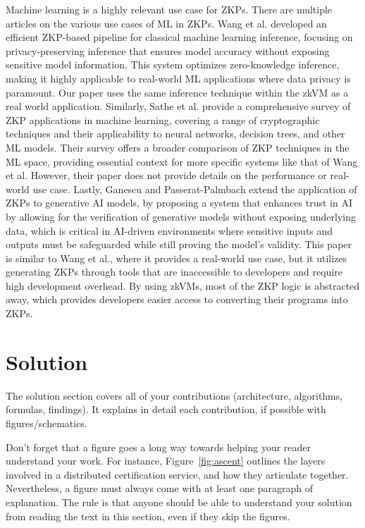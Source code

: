 \documentclass{scrartcl}
\begin{document}
Machine learning is a highly relevant use case for ZKPs. There are multiple articles on the various use cases of ML in ZKPs. Wang et al.\cite{wang2024efficient} developed an efficient ZKP-based pipeline for classical machine learning inference, focusing on privacy-preserving inference that ensures model accuracy without exposing sensitive model information. This system optimizes zero-knowledge inference, making it highly applicable to real-world ML applications where data privacy is paramount. Our paper uses the same inference technique within the zkVM as a real world application. Similarly, Sathe et al.\cite{sathe2024survey} provide a comprehensive survey of ZKP applications in machine learning, covering a range of cryptographic techniques and their applicability to neural networks, decision trees, and other ML models. Their survey offers a broader comparison of ZKP techniques in the ML space, providing essential context for more specific systems like that of Wang et al. However, their paper does not provide details on the performance or real-world use case. Lastly, Ganescu and Passerat-Palmbach\cite{ganescu2024trust} extend the application of ZKPs to generative AI models, by proposing a system that enhances trust in AI by allowing for the verification of generative models without exposing underlying data, which is critical in AI-driven environments where sensitive inputs and outputs must be safeguarded while still proving the model’s validity. This paper is similar to Wang et al., where it provides a real-world use case, but it utilizes generating ZKPs through tools that are inaccessible to developers and require high development overhead. By using zkVMs, most of the ZKP logic is abstracted away, which provides developers easier access to converting their programs into ZKPs.

\section{Solution}

The solution section covers all of your contributions (architecture, algorithms, formulas, findings).
It explains in detail each contribution, if possible with figures/schematics.

Don't forget that a figure goes a long way towards helping your reader understand your work. For instance, Figure~\ref{fig:ascent} outlines the layers involved in a distributed certification service, and how they articulate together. Nevertheless, a figure must always come with at least one paragraph of explanation. The rule is that anyone should be able to understand your solution from reading the text in this section, even if they skip the figures.
\end{document}
